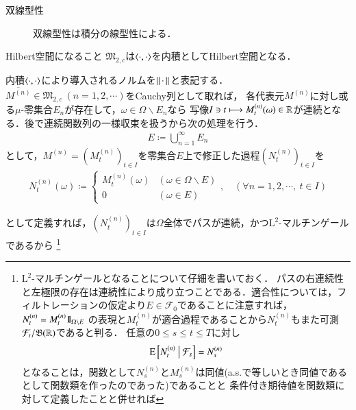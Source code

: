 \begin{description}
\begin{prf}
\begin{description}
					\item[双線型性]
						双線型性は積分の線型性による．
				\end{description}
				\QED
			\end{prf}
		
			\begin{itembox}[l]{Hilbert空間になること}
				$\mathfrak{M}_{2,c}$は$\inprod<\cdot,\cdot>$を内積としてHilbert空間となる．
			\end{itembox}
			
			\begin{prf}
				内積$\inprod<\cdot,\cdot>$により導入されるノルムを$\left\|\, \cdot\, \right\|_{}$と表記する．
				$\overline{M^{(n)}} \in \mathfrak{M}_{2,c}\ (n=1,2,\cdots)$をCauchy列として取れば，
				各代表元$M^{(n)}$に対し或る$\mu$-零集合$E_n$が存在して，$\omega \in \Omega \backslash E_n$なら
				写像$I \ni t \longmapsto M^{(n)}_t(\omega) \in \mathbb{R}$が連続となる．後で連続関数列の一様収束を扱うから次の処理を行う．
				\begin{align}
					E \coloneqq \bigcup_{n=1}^{\infty} E_n
				\end{align}
				として，$M^{(n)} = (M^{(n)}_t)_{t \in I}$を零集合$E$上で修正した過程$(N^{(n)}_t)_{t \in I}$を
				\begin{align}
					N^{(n)}_t(\omega) \coloneqq
					\begin{cases}
						M^{(n)}_t(\omega) & (\omega \in \Omega \backslash E) \\
						0 & (\omega \in E)
					\end{cases}
					,\quad (\forall n = 1,2,\cdots,\ t \in I)
				\end{align}
			\end{prf}
			として定義すれば，$(N^{(n)}_t)_{t \in I}$は$\Omega$全体でパスが連続，かつ$\mathrm{L}^2$-マルチンゲールであるから
			\footnote{
				$\mathrm{L}^2$-マルチンゲールとなることについて仔細を書いておく．
				パスの右連続性と左極限の存在は連続性により成り立つことである．適合性については，フィルトレーションの仮定より$E \in \mathcal{F}_0$であることに注意すれば，
				$N^{(n)}_t = M^{(n)}_t \mbox{1}\hspace{-0.25em}\mbox{l}_{\Omega \backslash E}$
				の表現と$M^{(n)}_t$が適合過程であることから$N^{(n)}_t$もまた可測$\mathcal{F}_t/\mathfrak{B}(\mathbb{R})$であると判る．
				任意の$0 \leq s \leq t \leq T$に対し
				\begin{align}
					\operatorname{E} \left[ N^{(n)}_t \ \middle|\ \mathcal{F}_s \right] = N^{(n)}_s
				\end{align}
				となることは，関数として$N^{(n)}_s$と$M^{(n)}_s$は同値(a.s.で等しいとき同値であるとして関数類を作ったのであった)であることと
				条件付き期待値を関数類に対して定義したことと併せれば
}
\end{description}
